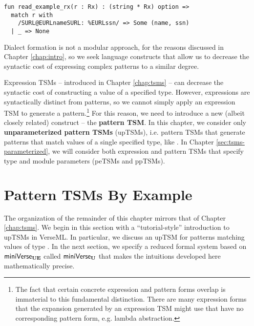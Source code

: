 \begin{lstlisting}
fun read_example_rx(r : Rx) : (string * Rx) option => 
  match r with 
    /SURL@EURLnameSURL: %EURLssn/ => Some (name, ssn)
  | _ => None\end{lstlisting}
\noindent
Dialect formation is not a modular approach, for the reasons discussed in Chapter \ref{chap:intro}, so we seek language constructs that allow us to decrease the syntactic cost of expressing complex patterns to a similar degree.

Expression TSMs -- introduced in Chapter \ref{chap:tsms} -- can decrease the syntactic cost of constructing a value of a specified type. However, expressions are syntactically distinct from patterns, so we cannot simply apply an expression TSM to generate a pattern.\footnote{The fact that certain concrete expression and pattern forms overlap is immaterial to this fundamental distinction. There are many expression forms that the expansion generated by an expression TSM might use that have no corresponding pattern form, e.g.  lambda abstraction.} %
For this reason, we need to introduce a new (albeit closely related) construct -- the \textbf{pattern TSM}. In this chapter, we consider only \textbf{unparameterized pattern TSMs} (upTSMs), i.e. pattern TSMs that generate patterns that match values of a single specified type, like . In Chapter \ref{sec:tsms-parameterized}, we will consider both expression and pattern TSMs that specify type and module parameters (peTSMs and ppTSMs). 

\section{Pattern TSMs By Example}\label{sec:ptsms-by-example}
The organization of the remainder of this chapter mirrors that of Chapter \ref{chap:tsms}. We begin in this section with a ``tutorial-style'' introduction to upTSMs in VerseML. In particular, we  discuss an upTSM for patterns matching values of type . In the next section, we specify a reduced formal system based on $\mathsf{miniVerse}_\textbf{UE}$ called $\mathsf{miniVerse}_\textbf{U}$ that makes the intuitions developed here mathematically precise.

